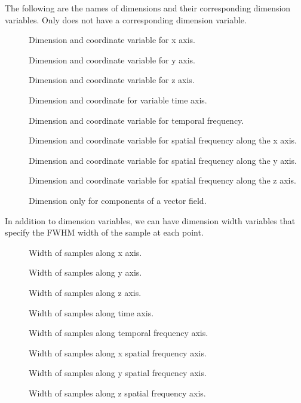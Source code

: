 The following are the names of dimensions and their corresponding
dimension variables. Only  does not have a
corresponding dimension variable.
\begin{description}
   \item [] Dimension and coordinate variable for x axis.
   \item [] Dimension and coordinate variable for y axis.
   \item [] Dimension and coordinate variable for z axis.
   \item [] Dimension and coordinate for variable time axis.
   \item [] Dimension and coordinate variable for
      temporal frequency.
   \item [] Dimension and coordinate variable for spatial 
      frequency along the x axis.
   \item [] Dimension and coordinate variable for spatial
      frequency along the y axis.
   \item [] Dimension and coordinate variable for spatial
      frequency along the z axis.
   \item [] Dimension only for components of
      a vector field.
\end{description}

In addition to dimension variables, we can have dimension width
variables that specify the FWHM width of the sample at each point.
\begin{description}
   \item [] Width of samples along x axis.
   \item [] Width of samples along y axis.
   \item [] Width of samples along z axis.
   \item [] Width of samples along time axis.
   \item [] Width of samples along temporal
      frequency axis.
   \item [] Width of samples along x spatial
      frequency axis.
   \item [] Width of samples along y spatial
      frequency axis.
   \item [] Width of samples along z spatial
      frequency axis.
\end{description}


